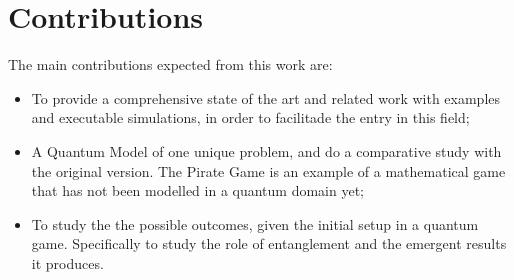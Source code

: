 \section{Contributions}
\label{sec:int_contributions}

The main contributions expected from this work are:

\begin{itemize}

\item To provide a comprehensive state of the art and related work with examples and executable simulations, in order to facilitade the entry in this field;

\item A Quantum Model of one unique problem, and do a comparative study with the original version. The Pirate Game is an example of a mathematical game that has not been modelled in a quantum domain yet;

\item To study the the possible outcomes, given the initial setup in a quantum game. Specifically to study the role of entanglement and the emergent results it produces.


\end{itemize}